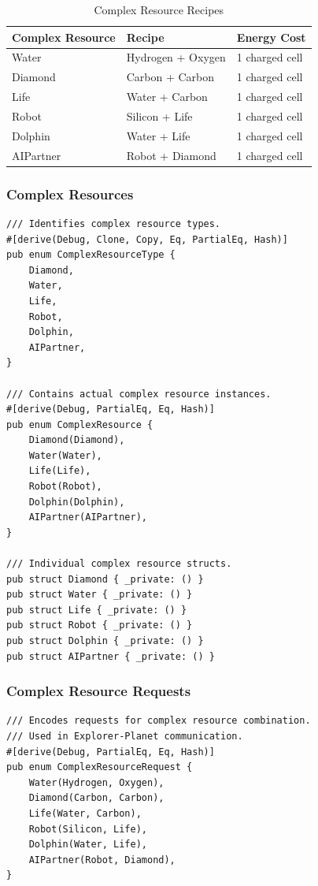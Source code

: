\documentclass[12pt,a4paper]{article}
\begin{document}
\begin{table}[H]
\centering
\begin{tabular}{|l|l|l|}
\hline
\textbf{Complex Resource} & \textbf{Recipe} & \textbf{Energy Cost} \\
\hline
Water & Hydrogen + Oxygen & 1 charged cell \\
Diamond & Carbon + Carbon & 1 charged cell \\
Life & Water + Carbon & 1 charged cell \\
Robot & Silicon + Life & 1 charged cell \\
Dolphin & Water + Life & 1 charged cell \\
AIPartner & Robot + Diamond & 1 charged cell \\
\hline
\end{tabular}
\caption{Complex Resource Recipes}
\label{tab:complex-recipes}
\end{table}

\subsubsection{Complex Resources}
\begin{lstlisting}[style=rustcool, caption={Complex Resource Types}, label=lst:complex-types]
/// Identifies complex resource types.
#[derive(Debug, Clone, Copy, Eq, PartialEq, Hash)]
pub enum ComplexResourceType {
    Diamond,
    Water,
    Life,
    Robot,
    Dolphin,
    AIPartner,
}

/// Contains actual complex resource instances.
#[derive(Debug, PartialEq, Eq, Hash)]
pub enum ComplexResource {
    Diamond(Diamond),
    Water(Water),
    Life(Life),
    Robot(Robot),
    Dolphin(Dolphin),
    AIPartner(AIPartner),
}

/// Individual complex resource structs.
pub struct Diamond { _private: () }
pub struct Water { _private: () }
pub struct Life { _private: () }
pub struct Robot { _private: () }
pub struct Dolphin { _private: () }
pub struct AIPartner { _private: () }
\end{lstlisting}

\newpage

\subsubsection{Complex Resource Requests}
\begin{lstlisting}[style=rustcool, caption={Complex Resource Request Enum}, label=lst:complex-request]
/// Encodes requests for complex resource combination.
/// Used in Explorer-Planet communication.
#[derive(Debug, PartialEq, Eq, Hash)]
pub enum ComplexResourceRequest {
    Water(Hydrogen, Oxygen),
    Diamond(Carbon, Carbon),
    Life(Water, Carbon),
    Robot(Silicon, Life),
    Dolphin(Water, Life),
    AIPartner(Robot, Diamond),
}
\end{lstlisting}
\end{document}
